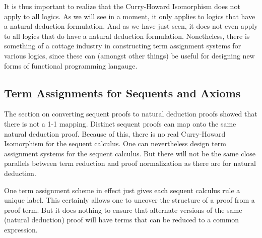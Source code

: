 It is thus important to realize that the Curry-Howard Isomorphism does
not apply to all logics.  As we will see in a moment, it only applies
to logics that have a natural deduction formulation.  And as we have
just seen, it does not even apply to all logics that do have a natural 
deduction formulation.  Nonetheless, there is something of a cottage
industry in constructing term assignment systems for various
logics, since these can (amongst other things) be useful for designing
new forms of functional programming langauge.


\subsection{Term Assignments for Sequents and Axioms}

The section on converting sequent proofs to natural deduction proofs
showed that there is not a 1-1 mapping.  Distinct sequent proofs can
map onto the same natural deduction proof.  Because of this, there
is no real Curry-Howard Isomorphism for the sequent calculus.  One
can nevertheless design term assignment systems for the sequent
calculus.
But there will not be the same close parallels between term reduction
and proof normalization as there are for natural deduction.

One term assignment scheme in effect just gives each sequent calculus
rule a unique label.  This certainly allows one to uncover the
structure of a proof from a proof term. But it does nothing to ensure
that alternate versions of the same (natural deduction) proof will
have terms that can be reduced to a common expression.


